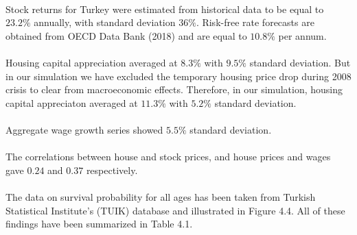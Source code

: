 \documentclass[]{elsarticle}
\begin{document}
\paragraph{}Stock returns for Turkey were estimated from historical data to be equal to $23.2\%$ annually, with standard deviation $36\%$. Risk-free rate forecasts are obtained from OECD Data Bank (2018) and are equal to $10.8\%$ per annum.

\paragraph{}Housing capital appreciation averaged at $8.3\%$ with $9.5\%$ standard deviation. But in our simulation we have excluded the temporary housing price drop during 2008 crisis to clear from macroeconomic effects. Therefore, in our simulation, housing capital appreciaton averaged at $11.3\%$ with $5.2\%$ standard deviation.

\paragraph{}Aggregate wage growth series showed $5.5\%$ standard deviation.

\paragraph{}The correlations between house and stock prices, and house prices and wages gave $0.24$ and $0.37$ respectively.

\paragraph{}The data on survival probability for all ages has been taken from Turkish Statistical Institute's (TUIK) database and illustrated in Figure 4.4. All of these findings have been summarized in Table 4.1. 
\end{document}

